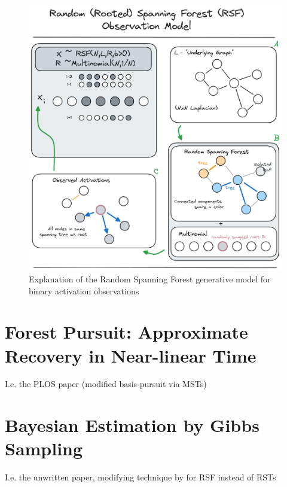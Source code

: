\documentclass[%
	12pt,
		oneside,
		letterpaper
]{book}
\begin{document}
\begin{figure}[H]

{\centering \includegraphics{images/random-spanning-forests.png}

}

\caption{Explanation of the Random Spanning Forest generative model for
binary activation observations}

\end{figure}%

\section{Forest Pursuit: Approximate Recovery in Near-linear
Time}\label{forest-pursuit-approximate-recovery-in-near-linear-time}

I.e. the PLOS paper (modified basis-pursuit via MSTs)

\section{Bayesian Estimation by Gibbs
Sampling}\label{bayesian-estimation-by-gibbs-sampling}

I.e. the unwritten paper, modifying technique by
\textcite{BayesianSpanningTree_Duan2021} for RSF instead of RSTs
\end{document}
